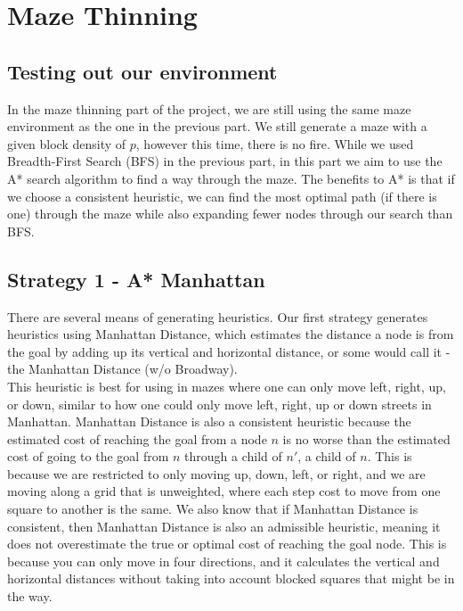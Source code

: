 \documentclass[11pt]{scrartcl} %
\begin{document}
\pagebreak
\section{Maze Thinning}

\subsection{Testing out our environment}
In the maze thinning part of the project, we are still using the same maze environment as the one in the previous part. We still generate a maze with a given block density of $p$, however this time, there is no fire. While we used Breadth-First Search (BFS) in the previous part, in this part we aim to use the A* search algorithm to find a way through the maze. The benefits to A* is that if we choose a consistent heuristic, we can find the most optimal path (if there is one) through the maze while also expanding fewer nodes through our search than BFS.

\subsection{Strategy 1 - A* Manhattan}

There are several means of generating heuristics. Our first strategy generates heuristics using Manhattan Distance, which estimates the distance a node is from the goal by adding up its vertical and horizontal distance, or some would call it - the Manhattan Distance (w/o Broadway).\vspace{2em}\\
This heuristic is best for using in mazes where one can only move left, right, up, or down, similar to how one could only move left, right, up or down streets in Manhattan. Manhattan Distance is also a consistent heuristic because the estimated cost of reaching the goal from a node $n$ is no worse than the estimated cost of going to the goal from $n$ through a child of $n'$, a child of $n$. This is because we are restricted to only moving up, down, left, or right, and we are moving along a grid that is unweighted, where each step cost to move from one square to another is the same. We also know that if Manhattan Distance is consistent, then Manhattan Distance is also an admissible heuristic, meaning it does not overestimate the true or optimal cost of reaching the goal node. This is because you can only move in four directions, and it calculates the vertical and horizontal distances without taking into account blocked squares that might be in the way. 
\end{document}
